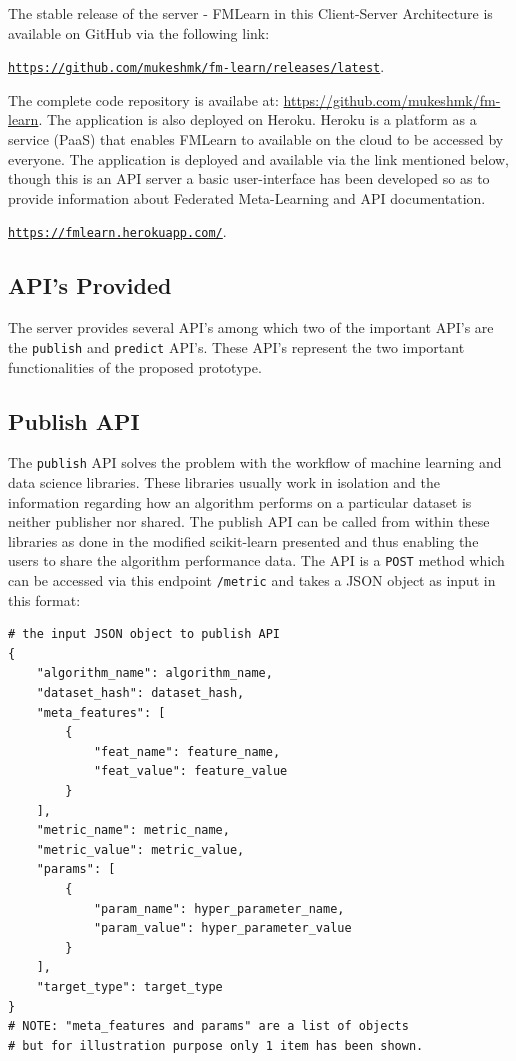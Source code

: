 The stable release of the server - FMLearn in this Client-Server Architecture is available on GitHub via the following link:

\begin{center}
\href{https://github.com/mukeshmk/fm-learn/releases/latest}
{\texttt{https://github.com/mukeshmk/fm-learn/releases/latest}}.
\end{center}

The complete code repository is availabe at: \href{https://github.com/mukeshmk/fm-learn}{https://github.com/mukeshmk/fm-learn}. The application is also deployed on Heroku. Heroku is a platform as a service (PaaS) that enables FMLearn to available on the cloud to be accessed by everyone. The application is deployed and available via the link mentioned below, though this is an API server a basic user-interface has been developed so as to provide information about Federated Meta-Learning and API documentation.

\begin{center}
\href{https://fmlearn.herokuapp.com/}
{\texttt{https://fmlearn.herokuapp.com/}}.
\end{center}

\subsection*{API's Provided}

The server provides several API's among which two of the important API's are the \texttt{publish} and \texttt{predict} API's. These API's represent the two important functionalities of the proposed prototype. 

\subsection*{Publish API}

The \texttt{publish} API solves the problem with the workflow of machine learning and data science libraries. These libraries usually work in isolation and the information regarding how an algorithm performs on a particular dataset is neither publisher nor shared. The publish API can be called from within these libraries as done in the modified scikit-learn presented and thus enabling the users to share the algorithm performance data. The API is a \texttt{POST} method which can be accessed via this endpoint \texttt{/metric} and takes a JSON object as input in this format:

\begin{lstlisting}
# the input JSON object to publish API
{
	"algorithm_name": algorithm_name,
	"dataset_hash": dataset_hash,
	"meta_features": [
		{
			"feat_name": feature_name,
			"feat_value": feature_value
		}
	],
	"metric_name": metric_name,
	"metric_value": metric_value,
	"params": [
		{
			"param_name": hyper_parameter_name,
			"param_value": hyper_parameter_value
		}
	],
	"target_type": target_type
}
# NOTE: "meta_features and params" are a list of objects
# but for illustration purpose only 1 item has been shown.
\end{lstlisting}

